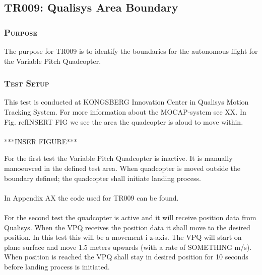 \newpage


\subsection{TR009: Qualisys Area Boundary}
         {}

\subsubsection*{\textsc{\medium Purpose}}
The purpose for TR009 is to identify the boundaries for the autonomous flight for the Variable Pitch Quadcopter.

\subsubsection*{\textsc{\medium Test Setup}}
This test is conducted at KONGSBERG Innovation Center in Qualisys Motion Tracking System. For more information about the MOCAP-system see XX. In Fig. ref{INSERT FIG} we see the area the quadcopter is aloud to move within. \\
\\

***INSER FIGURE***

For the first test the Variable Pitch Quadcopter is inactive. It is manually manoeuvred in the defined test area. When quadcopter is moved outside the boundary defined; the quadcopter shall initiate landing process.\\
\\
In Appendix AX the code used for TR009 can be found. \\
\\
For the second test the quadcopter is active and it will receive position data from Qualisys. When the VPQ receives the position data it shall move to the desired position. In this test this will be a movement i z-axis. The VPQ will start on plane surface and move 1.5 meters upwards (with a rate of SOMETHING m/s). When position is reached the VPQ shall stay in desired position for 10 seconds before landing process is initiated. 

